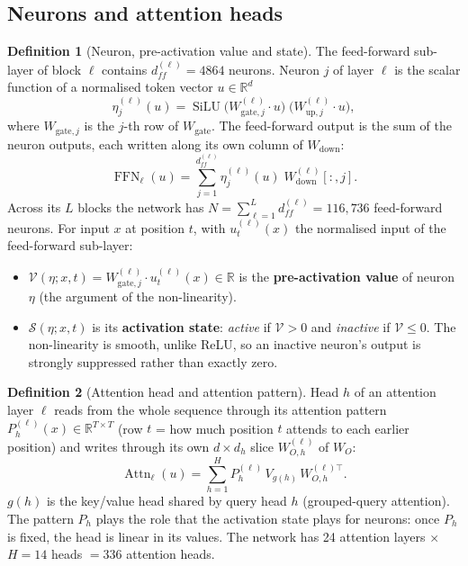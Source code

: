 \documentclass[10pt,a4paper]{article}
\newcommand{\op}[1]{\operatorname{#1}}
\theoremstyle{definition}
\newtheorem{definition}{Definition}[section]
\begin{document}
\subsection{Neurons and attention heads}
\begin{definition}[Neuron, pre-activation value and state]
The feed-forward sub-layer of block $\ell$ contains $d_{ff}^{(\ell)}=4864$ neurons. Neuron $j$ of layer $\ell$ is the scalar function of a normalised token vector $u\in\mathbb{R}^{d}$
\begin{equation}
  \eta^{(\ell)}_j(u) = \op{SiLU}\big(W^{(\ell)}_{\mathrm{gate},j}\cdot u\big)\;\big(W^{(\ell)}_{\mathrm{up},j}\cdot u\big),
\end{equation}
where $W_{\mathrm{gate},j}$ is the $j$-th row of $W_{\mathrm{gate}}$. The feed-forward output is the sum of the neuron outputs, each written along its own column of $W_{\mathrm{down}}$:
\begin{equation}
  \op{FFN}_\ell(u) = \sum_{j=1}^{d_{ff}^{(\ell)}} \eta^{(\ell)}_j(u)\;W^{(\ell)}_{\mathrm{down}}[:,j].
\end{equation}
Across its $L$ blocks the network has $N=\sum_{\ell=1}^{L} d_{ff}^{(\ell)}=116{,}736$ feed-forward neurons. For input $x$ at position $t$, with $u^{(\ell)}_t(x)$ the normalised input of the feed-forward sub-layer:
\begin{itemize}
\item $\mathcal{V}(\eta;x,t)=W^{(\ell)}_{\mathrm{gate},j}\cdot u^{(\ell)}_t(x)\in\mathbb{R}$ is the \textbf{pre-activation value} of neuron $\eta$ (the argument of the non-linearity).
\item $\mathcal{S}(\eta;x,t)$ is its \textbf{activation state}: \emph{active} if $\mathcal{V}>0$ and \emph{inactive} if $\mathcal{V}\le 0$. The non-linearity is smooth, unlike ReLU, so an inactive neuron's output is strongly suppressed rather than exactly zero.
\end{itemize}
\end{definition}
\begin{definition}[Attention head and attention pattern]
Head $h$ of an attention layer $\ell$ reads from the whole sequence through its attention pattern $P^{(\ell)}_h(x)\in\mathbb{R}^{T\times T}$ (row $t$ = how much position $t$ attends to each earlier position) and writes through its own $d\times d_h$ slice $W^{(\ell)}_{O,h}$ of $W_O$:
\begin{equation}
  \op{Attn}_\ell(u) = \sum_{h=1}^{H} P^{(\ell)}_h\,V_{g(h)}\,W^{(\ell)\top}_{O,h}.
\end{equation}
$g(h)$ is the key/value head shared by query head $h$ (grouped-query attention). The pattern $P_h$ plays the role that the activation state plays for neurons: once $P_h$ is fixed, the head is linear in its values. The network has 24 attention layers $\times$ $H=14$ heads $=336$ attention heads.
\end{definition}
\end{document}
